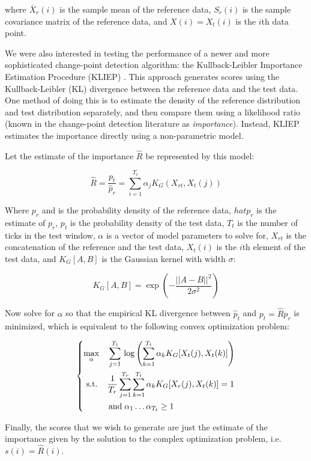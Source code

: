where $\bar{X}_r(i)$ is the sample mean of the reference data, $S_r(i)$
is the sample covariance matrix of the reference data, and $X(i)=X_t(i)$ is
the $i$th data point.

We were also interested in testing the performance of a newer and more
sophisticated change-point detection algorithm: the
Kullback-Leibler Importance Estimation Procedure (KLIEP)
\cite{sugiyama09} \cite{sugiyama08}.
This approach generates scores using the Kullback-Leibler (KL)
divergence between the reference data and the test data. One method of doing this
is to estimate the density of the reference distribution and test distribution
separately, and then compare them using a likelihood ratio
(known in the change-point detection literature as \emph{importance}). 
Instead, KLIEP estimates the importance directly using a non-parametric model.

Let the estimate of the importance $\hat{R}$ be represented by this model:

\[
\hat{R} = \frac{p_t}{\hat{p}_r} = \sum_{i=1}^{T_t} \alpha_j K_G(X_{rt},X_t(j))
\]

Where $p_r$ and is the probability density of the reference data,
$hat{p}_r$ is the estimate of $p_r$,
$p_t$ is the probability density of the test
data, $T_t$ is the number of ticks in the test window, $\alpha$ is a
vector of model parameters to solve for, $X_{rt}$ is the concatenation of the reference and the
test data, $X_t(i)$ is the $i$th element of the test data,
and $K_G[A,B]$ is the Gaussian kernel with width $\sigma$:

\[
K_G[A,B] = \exp \left(-\frac{||A-B||^2}{2\sigma^2}\right)
\]

Now solve for $\alpha$ so that the empirical KL divergence between $\hat{p}_t$ and
$p_t = \hat{R}p_r$ is minimized, which is equivalent to the following convex optimization
problem:

\[
\begin{dcases}
 \max_{\alpha} \quad \sum_{j=1}^{T_t} \, \log \left( \sum_{k=1}^{T_t} \alpha_k K_G[X_t(j), X_t(k)] \right) \\
 \,\, \text{s.t.} \quad\, \frac{1}{T_r} \sum_{j=1}^{T_r} \sum_{k=1}^{T_t} \alpha_k K_G[X_r(j),X_t(k)] = 1 \\
 \qquad \quad \text{and} \; \alpha_1 \ldots \alpha_{T_t} \ge 1
\end{dcases}
\]

Finally, the scores that we wish to generate are just the estimate of the importance given by the
solution to the complex optimization problem, i.e. $s(i) = \hat{R}(i)$.

